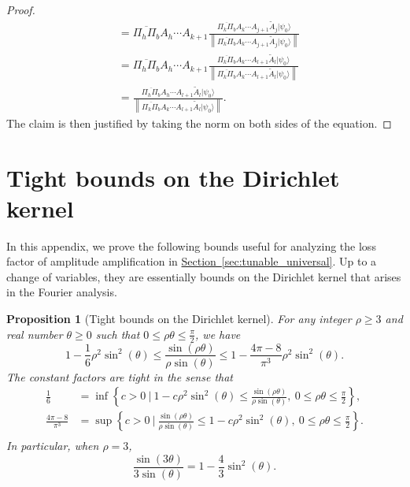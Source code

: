 \documentclass[letterpaper,onecolumn,11pt,accepted=2026-02-14]{quantumarticle}
\newcommand{\norm}[1]{\left\lVert#1\right\rVert}
\newtheorem{proposition}[lemma]{Proposition}
\theoremstyle{remark}
\theoremstyle{plain}
\renewcommand{\sec}[1]{\hyperref[sec:#1]{Section~\ref*{sec:#1}}}
\newcommand{\ket}[1]{|#1\rangle}
\begin{document}
\begin{proof}
\begin{equation}
\begin{aligned}
    &=\overline{\Pi_{h}\Pi_b}A_{h}\cdots A_{k+1}\frac{\overline{\Pi_{k}\Pi_b}A_{k}\cdots A_{j+1}\widetilde{A}_{j}\ket{\psi_0}}{\norm{\overline{\Pi_{k}\Pi_b}A_{k}\cdots A_{j+1}\widetilde{A}_{j}\ket{\psi_0}}}\\
    &=\overline{\Pi_{h}\Pi_b}A_{h}\cdots A_{k+1}\frac{\overline{\Pi_{k}\Pi_b}A_k\cdots A_{l+1}\widetilde{A}_l\ket{\psi_0}}{\norm{\overline{\Pi_{k}\Pi_b}A_k\cdots A_{l+1}\widetilde{A}_l\ket{\psi_0}}}\\
    &=\frac{\overline{\Pi_{h}\Pi_b}A_h\cdots A_{l+1}\widetilde{A}_l\ket{\psi_0}}{\norm{\overline{\Pi_{k}\Pi_b}A_k\cdots A_{l+1}\widetilde{A}_l\ket{\psi_0}}}.
\end{aligned}
\end{equation}
The claim is then justified by taking the norm on both sides of the equation.
\end{proof}

\section{Tight bounds on the Dirichlet kernel}
\label{append:dirichlet}

In this appendix, we prove the following bounds useful for analyzing the loss factor of amplitude amplification in \sec{tunable_universal}. Up to a change of variables, they are essentially bounds on the Dirichlet kernel that arises in the Fourier analysis.

\begin{proposition}[Tight bounds on the Dirichlet kernel]
\label{prop:dirichlet}
For any integer $\rho\geq3$ and real number $\theta\geq0$ such that $0\leq\rho\theta\leq\frac{\pi}{2}$, we have
    \begin{equation}
        1-\frac{1}{6}\rho^2\sin^2(\theta)
    \leq\frac{\sin(\rho\theta)}{\rho\sin(\theta)}
    \leq1-\frac{4\pi-8}{\pi^3}\rho^2\sin^2(\theta).
    \end{equation}
The constant factors are tight in the sense that
    \begin{equation}
    \begin{aligned}
        \frac{1}{6}&=\inf\left\{c>0\ \bigg|\ 1-c\rho^2\sin^2(\theta)
    \leq\frac{\sin(\rho\theta)}{\rho\sin(\theta)},\ 0\leq\rho\theta\leq\frac{\pi}{2}\right\},\\
    \frac{4\pi-8}{\pi^3}&=\sup\left\{c>0\ \bigg|\ \frac{\sin(\rho\theta)}{\rho\sin(\theta)}\leq1-c\rho^2\sin^2(\theta)
    ,\ 0\leq\rho\theta\leq\frac{\pi}{2}\right\}.\\
    \end{aligned}
    \end{equation}
In particular, when $\rho=3$,
\begin{equation}
    \frac{\sin(3\theta)}{3\sin(\theta)}
    =1-\frac{4}{3}\sin^2(\theta).
\end{equation}
\end{proposition}
\end{document}
